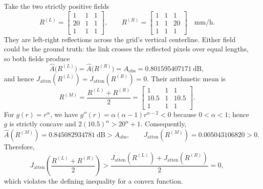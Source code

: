 \documentclass[a4paper,fleqn]{cas-sc}
\begin{document}
Take the two strictly positive fields
\[
R^{(L)}=\begin{bmatrix}1&1&1\\20&1&1\\1&1&1\end{bmatrix},
\qquad
R^{(R)}=\begin{bmatrix}1&1&1\\1&1&20\\1&1&1\end{bmatrix}
\quad \si{\milli\meter\per\hour}.
\]
They are left-right reflections across the grid's vertical centerline.  Either
field could be the ground truth: the link crosses the reflected pixels over
equal lengths, so both fields produce
\[
\widehat A\bigl(R^{(L)}\bigr)=\widehat A\bigl(R^{(R)}\bigr)
=A_{\mathrm{obs}}=0.801595407171\ \si{\deci\bel},
\]
and hence
$J_{\mathrm{atten}}(R^{(L)})=J_{\mathrm{atten}}(R^{(R)})=0$.
Their arithmetic mean is
\[
R^{(M)}=\frac{R^{(L)}+R^{(R)}}{2}
=\begin{bmatrix}1&1&1\\10.5&1&10.5\\1&1&1\end{bmatrix}.
\]
For $g(r)=r^\alpha$, we have
$g''(r)=\alpha(\alpha-1)r^{\alpha-2}<0$ because $0<\alpha<1$; hence $g$ is
strictly concave and
$2(10.5)^\alpha>20^\alpha+1$.  Consequently,
\[
\widehat A(R^{(M)})=0.845082934781\ \si{\deci\bel}>A_{\mathrm{obs}},
\qquad
J_{\mathrm{atten}}(R^{(M)})=0.005043106820>0.
\]
Therefore,
\[
J_{\mathrm{atten}}\!\left(\frac{R^{(L)}+R^{(R)}}{2}\right)
>
\frac{J_{\mathrm{atten}}(R^{(L)})+J_{\mathrm{atten}}(R^{(R)})}{2}=0,
\]
which violates the defining inequality for a convex function.

\clearpage
\end{document}
